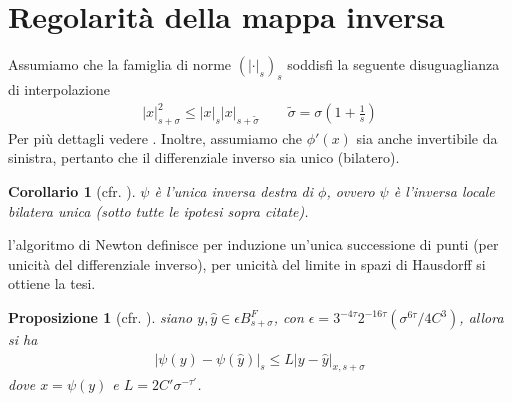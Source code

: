 \documentclass[twoside, 11pt]{amsbook}
\makeatletter
\newcommand{\0}{{(0)}}
\newcommand{\3}{{(3)}}
\theoremstyle{colonplain}
\newtheorem{prop}[thm]{Proposizione}
\newtheorem{cor}[thm]{Corollario}
\theoremstyle{colondefinition}
\theoremstyle{colonremark}
\numberwithin{equation}{chapter}
\renewcommand{\proofname}{Dimostrazione}
\renewenvironment{proof}[1][\proofname]{\par
  \pushQED{\qed}%
  \normalfont \topsep6\p@\@plus6\p@\relax
  \trivlist
  \item[\hskip\labelsep\bfseries #1:]\ignorespaces
}{%
  \popQED\endtrivlist\@endpefalse
}
\makeatother
\begin{document}
\section{Regolarità della mappa inversa}
Assumiamo che la famiglia di norme $(|\cdot|_s)_s$ soddisfi la seguente disuguaglianza di interpolazione
\begin{align}
    |x|^2_{s + \sigma} \leq |x|_s|x|_{s + \widetilde{\sigma}} \qquad \widetilde{\sigma} = \sigma\left(1 + \frac{1}{s}\right)
\end{align}
Per più dettagli vedere \cite{Fejoz17}.
Inoltre, assumiamo che $\phi'(x)$ sia anche invertibile da sinistra, pertanto che il differenziale inverso sia unico (bilatero).
\begin{cor}[cfr. \cite{Massetti}] $\psi$ è l'unica inversa destra di $\phi$, ovvero $\psi$ è l'inversa locale bilatera unica (sotto tutte le ipotesi sopra citate).
\end{cor}

\begin{proof} l'algoritmo di Newton definisce per induzione un'unica successione di punti (per unicità del differenziale inverso), per unicità del limite in spazi di Hausdorff si ottiene la tesi.
\end{proof}
\begin{prop}[cfr. \cite{Massetti}]\label{LipschCont} siano $y, \hat{y} \in \epsilon B^F_{s + \sigma}$, con $\epsilon = 3^{-4\tau}2^{-16\tau}(\sigma^{6\tau}/4C^3)$, allora si ha
\begin{align}
    |\psi(y) - \psi(\hat{y})|_{s} \leq L|y - \hat{y}|_{x, s + \sigma} 
\end{align}
dove $x = \psi(y)$ e $L = 2C'\sigma^{-\tau'}$.
\end{prop}
\end{document}

